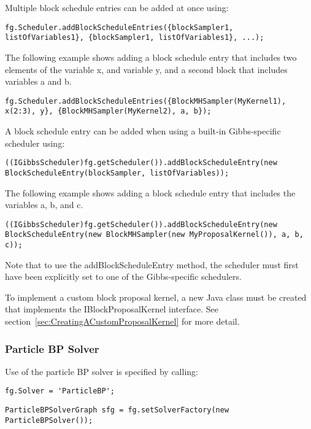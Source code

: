 Multiple block schedule entries can be added at once using:
\begin{lstlisting}
fg.Scheduler.addBlockScheduleEntries({blockSampler1, listOfVariables1}, {blockSampler1, listOfVariables1}, ...);
\end{lstlisting}

The following example shows adding a block schedule entry that includes two elements of the variable x, and variable y, and a second block that includes variables a and b.

\begin{lstlisting}
fg.Scheduler.addBlockScheduleEntries({BlockMHSampler(MyKernel1), x(2:3), y}, {BlockMHSampler(MyKernel2), a, b});
\end{lstlisting}

\fi

\ifjava
A block schedule entry can be added when using a built-in Gibbs-specific scheduler using:

\begin{lstlisting}
((IGibbsScheduler)fg.getScheduler()).addBlockScheduleEntry(new BlockScheduleEntry(blockSampler, listOfVariables));
\end{lstlisting}

The following example shows adding a block schedule entry that includes the variables a, b, and c.

\begin{lstlisting}
((IGibbsScheduler)fg.getScheduler()).addBlockScheduleEntry(new BlockScheduleEntry(new BlockMHSampler(new MyProposalKernel()), a, b, c));
\end{lstlisting}

Note that to use the addBlockScheduleEntry method, the scheduler must first have been explicitly set to one of the Gibbs-specific schedulers.
\fi

To implement a custom block proposal kernel, a new Java class must be created that implements the IBlockProposalKernel interface.  See section~\ref{sec:CreatingACustomProposalKernel} for more detail.

\clearpage
\subsubsection{Particle BP Solver}

Use of the particle BP solver is specified by calling:

\ifmatlab
\begin{lstlisting}
fg.Solver = 'ParticleBP';
\end{lstlisting}
\fi
\ifjava
\begin{lstlisting}
ParticleBPSolverGraph sfg = fg.setSolverFactory(new ParticleBPSolver());
\end{lstlisting}
\fi

